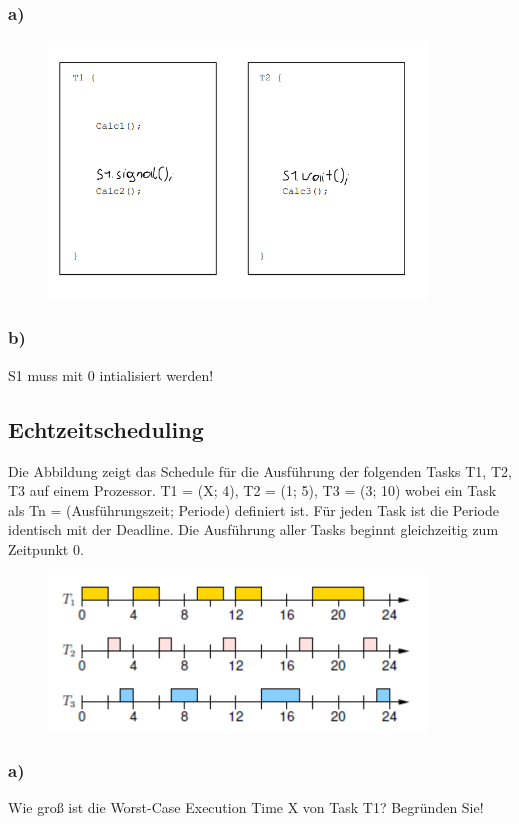\subsubsection{a)}
\begin{figure}[H]
  \includegraphics[width=10cm]{images/KA280521/3a.PNG}
  \centering
\end{figure}

\subsubsection{b)}
S1 muss mit 0 intialisiert werden!

\subsection{Echtzeitscheduling}
Die Abbildung zeigt das Schedule für die Ausführung der folgenden Tasks T1, T2, T3 auf einem Prozessor.
T1 = (X; 4), T2 = (1; 5), T3 = (3; 10)
wobei ein Task als Tn = (Ausführungszeit; Periode) definiert ist. Für jeden Task ist die Periode identisch mit
der Deadline. Die Ausführung aller Tasks beginnt gleichzeitig zum Zeitpunkt 0.
\begin{figure}[H]
  \includegraphics[width=10cm]{images/KA280521/4a.PNG}
  \centering
\end{figure}

\subsubsection{a)}
Wie groß ist die Worst-Case Execution Time X von Task T1? Begründen Sie!

